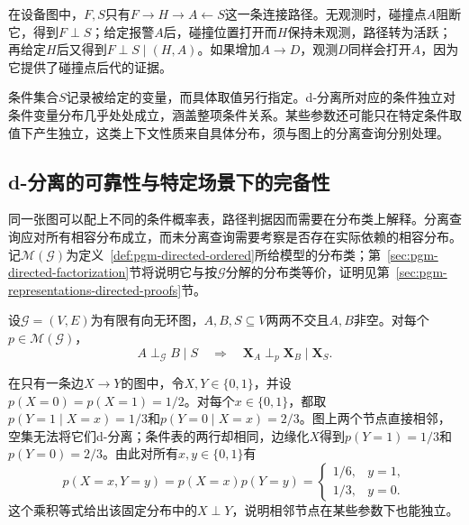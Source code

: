 在设备图中，$F,S$只有$F\to H\to A\leftarrow S$这一条连接路径。无观测时，碰撞点$A$阻断它，得到$F\perp S$；给定报警$A$后，碰撞位置打开而$H$保持未观测，路径转为活跃；再给定$H$后又得到$F\perp S\mid(H,A)$。如果增加$A\to D$，观测$D$同样会打开$A$，因为它提供了碰撞点后代的证据。

条件集合$S$记录被给定的变量，而具体取值另行指定。d-分离所对应的条件独立对条件变量分布几乎处处成立，涵盖整项条件关系。某些参数还可能只在特定条件取值下产生独立，这类上下文性质来自具体分布，须与图上的分离查询分别处理。

\subsection{d-分离的可靠性与特定场景下的完备性}
\label{sec:pgm-directed-sound-complete}

同一张图可以配上不同的条件概率表，路径判据因而需要在分布类上解释。分离查询应对所有相容分布成立，而未分离查询需要考察是否存在实际依赖的相容分布。记$\mathcal{M}(\mathcal{G})$为定义~\ref{def:pgm-directed-ordered}所给模型的分布类；第~\ref{sec:pgm-directed-factorization}节将说明它与按$\mathcal{G}$分解的分布类等价，证明见第~\ref{sec:pgm-representations-directed-proofs}节。

\begin{theorem}[d-分离的可靠性]
  \label{thm:pgm-directed-soundness}
  设$\mathcal{G}=(V,E)$为有限有向无环图，$A,B,S\subseteq V$两两不交且$A,B$非空。对每个$p\in\mathcal{M}(\mathcal{G})$，
  \begin{equation}
    A\perp_{\mathcal{G}}B\mid S
    \quad\Longrightarrow\quad
    \bm{X}_A\perp_p\bm{X}_B\mid\bm{X}_S.
    \label{eq:pgm-directed-soundness}
  \end{equation}
\end{theorem}

\begin{example}[未分离但独立的固定分布]
  \label{ex:pgm-directed-unseparated-independent}
  在只有一条边$X\to Y$的图中，令$X,Y\in\{0,1\}$，并设$p(X=0)=p(X=1)=1/2$。对每个$x\in\{0,1\}$，都取$p(Y=1\mid X=x)=1/3$和$p(Y=0\mid X=x)=2/3$。图上两个节点直接相邻，空集无法将它们d-分离；条件表的两行却相同，边缘化$X$得到$p(Y=1)=1/3$和$p(Y=0)=2/3$。由此对所有$x,y\in\{0,1\}$有
  \[
    p(X=x,Y=y)
    =
    p(X=x)p(Y=y)
    =
    \begin{cases}
      1/6,&y=1,\\
      1/3,&y=0.
    \end{cases}
  \]
  这个乘积等式给出该固定分布中的$X\perp Y$，说明相邻节点在某些参数下也能独立。
\end{example}

